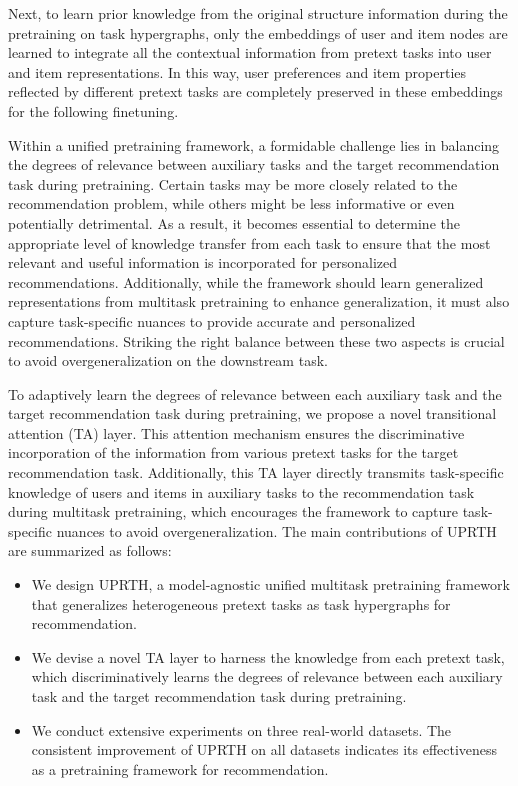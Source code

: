Next, to learn prior knowledge from the original structure information during the pretraining on task hypergraphs, only the embeddings of user and item nodes are learned to integrate all the contextual information from pretext tasks into user and item representations. In this way, user preferences and item properties reflected by different pretext tasks are completely preserved in these embeddings for the following finetuning. 

Within a unified pretraining framework, a formidable challenge lies in balancing the degrees of relevance between auxiliary tasks and the target recommendation task during pretraining. Certain tasks may be more closely related to the recommendation problem, while others might be less informative or even potentially detrimental. As a result, it becomes essential to determine the appropriate level of knowledge transfer from each task to ensure that the most relevant and useful information is incorporated for personalized recommendations. Additionally, while the framework should learn generalized representations from multitask pretraining to enhance generalization, it must also capture task-specific nuances to provide accurate and personalized recommendations. Striking the right balance between these two aspects is crucial to avoid overgeneralization on the downstream task.

To adaptively learn the degrees of relevance between each auxiliary task and the target recommendation task during pretraining, we propose a novel transitional attention (TA) layer. This attention mechanism ensures the discriminative incorporation of the information from various pretext tasks for the target recommendation task.
Additionally, this TA layer directly transmits task-specific knowledge of users and items in auxiliary tasks to the recommendation task during multitask pretraining, which encourages the framework to capture task-specific nuances to avoid overgeneralization. 
The main contributions of UPRTH are summarized as follows:
\begin{itemize}[left=0pt]
    \item  We design UPRTH, a model-agnostic unified multitask pretraining framework that generalizes heterogeneous pretext tasks as task hypergraphs for recommendation.
    \item We devise a novel TA layer to harness the knowledge from each pretext task, which discriminatively learns the degrees of relevance between each auxiliary task and the target recommendation task during pretraining.
    \item We conduct extensive experiments on three real-world datasets. The consistent improvement of UPRTH on all datasets indicates its effectiveness as a pretraining framework for recommendation.
\end{itemize}

